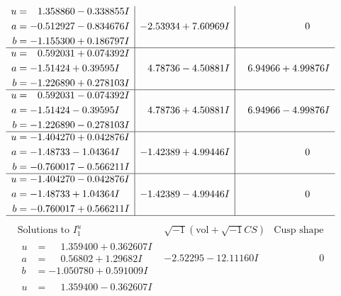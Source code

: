 \documentclass[1p]{elsarticle_modified}
\theoremstyle{definition}
\newcommand{\I}{\sqrt{-1}}
\begin{document}
$$\begin{array}{c|c|c}
\begin{aligned}
u &= \phantom{-}1.358860 - 0.338855 I \\
a &= -0.512927 - 0.834676 I \\
b &= -1.155300 + 0.186797 I\end{aligned}
 & -2.53934 + 7.60969 I & \phantom{-0.000000 } 0 \\ \hline\begin{aligned}
u &= \phantom{-}0.592031 + 0.074392 I \\
a &= -1.51424 + 0.39595 I \\
b &= -1.226890 + 0.278103 I\end{aligned}
 & \phantom{-}4.78736 - 4.50881 I & \phantom{-}6.94966 + 4.99876 I \\ \hline\begin{aligned}
u &= \phantom{-}0.592031 - 0.074392 I \\
a &= -1.51424 - 0.39595 I \\
b &= -1.226890 - 0.278103 I\end{aligned}
 & \phantom{-}4.78736 + 4.50881 I & \phantom{-}6.94966 - 4.99876 I \\ \hline\begin{aligned}
u &= -1.404270 + 0.042876 I \\
a &= -1.48733 - 1.04364 I \\
b &= -0.760017 - 0.566211 I\end{aligned}
 & -1.42389 + 4.99446 I & \phantom{-0.000000 } 0 \\ \hline\begin{aligned}
u &= -1.404270 - 0.042876 I \\
a &= -1.48733 + 1.04364 I \\
b &= -0.760017 + 0.566211 I\end{aligned}
 & -1.42389 - 4.99446 I & \phantom{-0.000000 } 0\\
 \hline 
 \end{array}$$\newpage$$\begin{array}{c|c|c}  
\text{Solutions to }I^u_{1}& \I (\text{vol} + \sqrt{-1}CS) & \text{Cusp shape}\\
 \hline 
\begin{aligned}
u &= \phantom{-}1.359400 + 0.362607 I \\
a &= \phantom{-}0.56802 + 1.29682 I \\
b &= -1.050780 + 0.591009 I\end{aligned}
 & -2.52295 - 12.11160 I & \phantom{-0.000000 } 0 \\ \hline\begin{aligned}
u &= \phantom{-}1.359400 - 0.362607 I \\

\end{aligned}
\end{array}$$
\end{document}

